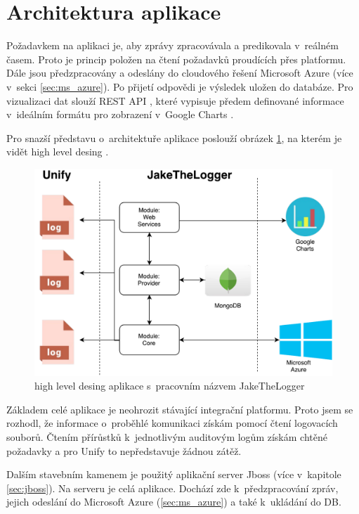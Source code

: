 \documentclass[thesis=M,czech]{FITthesis}[2012/10/20]
\newcommand{\tmpframe}[1]{\fbox{#1}}
\renewcommand{\tmpframe}[1]{#1}
\begin{document}
	\section{Architektura aplikace}
	Požadavkem na aplikaci je, aby zprávy zpracovávala a predikovala v~reálném časem. Proto je princip položen na čtení požadavků proudících přes platformu. Dále jsou předzpracovány a odeslány do cloudového řešení Microsoft Azure (více v~sekci \ref{sec:ms_azure}). Po přijetí odpovědi je výsledek uložen do databáze. Pro vizualizaci dat slouží REST API \cite{rest}, které vypisuje předem definované informace v~ideálním formátu pro zobrazení v~Google Charts \cite{googleCharts}.
	
	Pro snazší představu o~architektuře aplikace poslouží obrázek \ref{fig:hld_architecture}, na kterém je vidět high level desing \cite{hld_johnson}.
	
	\begin{figure}[htb]\centering
		\tmpframe{\includegraphics[width=\textwidth]{./img/jake_HLD}}		
		\caption{high level desing aplikace s~pracovním názvem JakeTheLogger}
		\label{fig:hld_architecture}
	\end{figure}

	Základem celé aplikace je neohrozit stávající integrační platformu. Proto jsem se rozhodl, že informace o~proběhlé komunikaci získám pomocí čtení logovacích souborů.
	Čtením přírůstků k~jednotlivým auditovým logům získám chtěné požadavky a pro Unify to nepředstavuje žádnou zátěž.
	
	Dalším stavebním kamenem je použitý aplikační server Jboss (více v~kapitole \ref{sec:jboss}). Na serveru je celá aplikace. Dochází zde k~předzpracování zpráv, jejich odeslání do Microsoft Azure (\ref{sec:ms_azure}) a také k~ukládání do DB.
	
\end{document}
